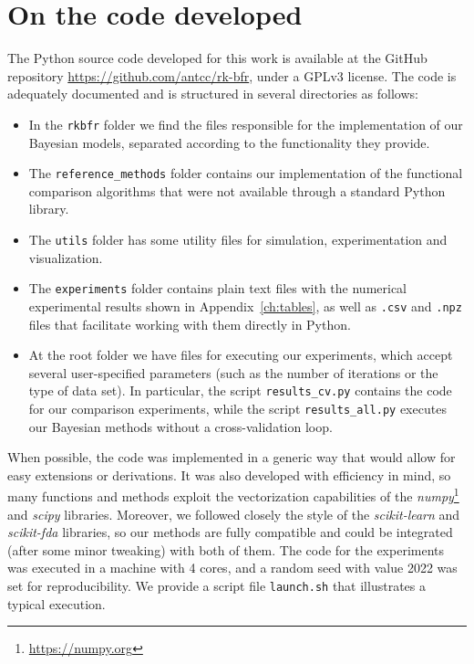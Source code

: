 %
%

\chapter{On the code developed}\label{ch:code}

The Python source code developed for this work is available at the GitHub repository \url{https://github.com/antcc/rk-bfr}, under a GPLv3 license. The code is adequately documented and is structured in several directories as follows:

\begin{itemize}
  \item In the \texttt{rkbfr} folder we find the files responsible for the implementation of our Bayesian models, separated according to the functionality they provide.
  \item The \texttt{reference\_methods} folder contains our implementation of the functional comparison algorithms that were not available through a standard Python library.
  \item The \texttt{utils} folder has some utility files for simulation, experimentation and visualization.
  \item The \texttt{experiments} folder contains plain text files with the numerical experimental results shown in Appendix~\ref{ch:tables}, as well as \texttt{.csv} and \texttt{.npz} files that facilitate working with them directly in Python.
  \item At the root folder we have files for executing our experiments, which accept several user-specified parameters (such as the number of iterations or the type of data set). In particular, the script \texttt{results\_cv.py} contains the code for our comparison experiments, while the script \texttt{results\_all.py} executes our Bayesian methods without a cross-validation loop.
\end{itemize}

When possible, the code was implemented in a generic way that would allow for easy extensions or derivations. It was also developed with efficiency in mind, so many functions and methods exploit the vectorization capabilities of the \textit{numpy}\footnote{\url{https://numpy.org}} and \textit{scipy} libraries. Moreover, we followed closely the style of the \textit{scikit-learn} and \textit{scikit-fda} libraries, so our methods are fully compatible and could be integrated (after some minor tweaking) with both of them. The code for the experiments was executed in a machine with 4 cores, and a random seed with value 2022 was set for reproducibility. We provide a script file \texttt{launch.sh} that illustrates a typical execution.

